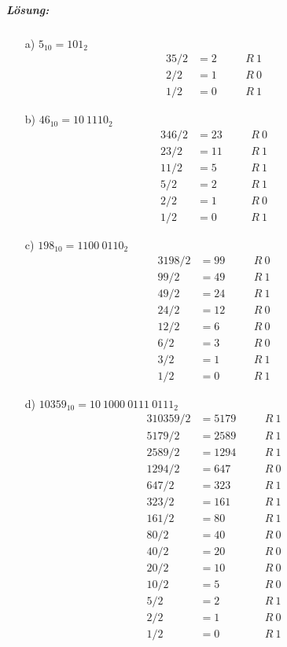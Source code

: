 \documentclass[12pt,a4paper,ngerman]{scrartcl}
\begin{document}
	\subparagraph{Lösung:} 
	\begin{itemize}
		\item[a)] $5_{10} = 101_2$
	  	\begin{alignat*}{3}
		  	5 / 2 &= 2 && \quad R\ 1\\
		  	2 / 2 &= 1 && \quad R\ 0\\
		  	1 / 2 &= 0 && \quad R\ 1
	  	\end{alignat*}
	  	
		\item[b)] $46_{10} = 10\ 1110_2$
		\begin{alignat*}{3}
			46 / 2 &= 23 && \quad R\ 0\\
			23 / 2 &= 11 && \quad R\ 1\\
			11 / 2 &= 5 && \quad R\ 1\\
			5 / 2 &= 2 && \quad R\ 1\\
			2 / 2 &= 1 && \quad R\ 0\\
			1 / 2 &= 0 && \quad R\ 1
		\end{alignat*}
		
		
		\item[c)] $198_{10} = 1100\ 0110_2$
		\begin{alignat*}{3}
			198 / 2 &= 99 && \quad R\ 0\\
			99 / 2 &= 49 && \quad R\ 1\\
			49 / 2 &= 24 && \quad R\ 1\\
			24 / 2 &= 12 && \quad R\ 0\\
			12 / 2 &= 6 && \quad R\ 0\\
			6 / 2 &= 3 && \quad R\ 0\\
			3 / 2 &= 1 && \quad R\ 1\\
			1 / 2 &= 0 && \quad R\ 1
		\end{alignat*}
		
		
		\item[d)] $10359_{10} = 10\ 1000\ 0111\ 0111_2$
		\begin{alignat*}{3}
			10359 / 2 &= 5179 && \quad R\ 1\\
			5179 / 2 &= 2589 && \quad R\ 1\\
			2589 / 2 &= 1294 && \quad R\ 1\\
			1294 / 2 &= 647 && \quad R\ 0\\
			647 / 2 &= 323 && \quad R\ 1\\
			323 / 2 &= 161 && \quad R\ 1\\
			161 / 2 &= 80 && \quad R\ 1\\
			80 / 2 &= 40 && \quad R\ 0\\
			40 / 2 &= 20 && \quad R\ 0\\
			20 / 2 &= 10 && \quad R\ 0\\
			10 / 2 &= 5 && \quad R\ 0\\
			5 / 2 &= 2 && \quad R\ 1\\
			2 / 2 &= 1 && \quad R\ 0\\
			1 / 2 &= 0 && \quad R\ 1
		\end{alignat*}
	\end{itemize}
	
\end{document}
